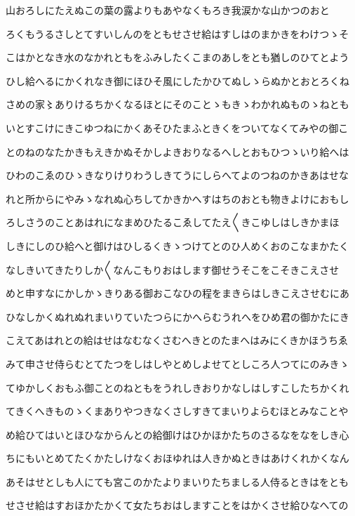 \documentclass[a4paper,11pt,landscape]{ltjtarticle}
\begin{document}
山おろしにたえぬこの葉の露よりもあやなくもろき我涙かな山かつのおと
\par\medskip
ろくもうるさしとてすいしんのをともせさせ給はすしはのまかきをわけつゝそ
\par\medskip
こはかとなき水のなかれともをふみしたくこまのあしをとも猶しのひてとよう
\par\medskip
ひし給へるにかくれなき御にほひそ風にしたかひてぬしゝらぬかとおとろくね
\par\medskip
さめの家〻ありけるちかくなるほとにそのことゝもきゝわかれぬものゝねとも
\par\medskip
いとすこけにきこゆつねにかくあそひたまふときくをついてなくてみやの御こ
\par\medskip
とのねのなたかきもえきかぬそかしよきおりなるへしとおもひつゝいり給へは
\par\medskip
ひわのこゑのひゝきなりけりわうしきてうにしらへてよのつねのかきあはせな
\par\medskip
れと所からにやみゝなれぬ心ちしてかきかへすはちのおとも物きよけにおもし
\par\medskip
ろしさうのことあはれになまめひたるこゑしてたえ〱きこゆしはしきかまほ
\par\medskip
しきにしのひ給へと御けはひしるくきゝつけてとのひ人めくおのこなまかたく
\par\medskip
なしきいてきたりしか〱なんこもりおはします御せうそこをこそきこえさせ
\par\medskip
めと申すなにかしかゝきりある御おこなひの程をまきらはしきこえさせむにあ
\par\medskip
ひなしかくぬれぬれまいりていたつらにかへらむうれへをひめ君の御かたにき
\par\medskip
こえてあはれとの給はせはなむなくさむへきとのたまへはみにくきかほうちゑ
\par\medskip
みて申させ侍らむとてたつをしはしやとめしよせてとしころ人つてにのみきゝ
\par\medskip
てゆかしくおもふ御ことのねともをうれしきおりかなしはしすこしたちかくれ
\par\medskip
てきくへきものゝくまありやつきなくさしすきてまいりよらむほとみなことや
\par\medskip
め給ひてはいとほひなからんとの給御けはひかほかたちのさるなをなをしき心
\par\medskip
ちにもいとめてたくかたしけなくおほゆれは人きかぬときはあけくれかくなん
\par\medskip
あそはせとしも人にても宮このかたよりまいりたちましる人侍るときはをとも
\par\medskip
せさせ給はすおほかたかくて女たちおはしますことをはかくさせ給ひなへての
\end{document}
